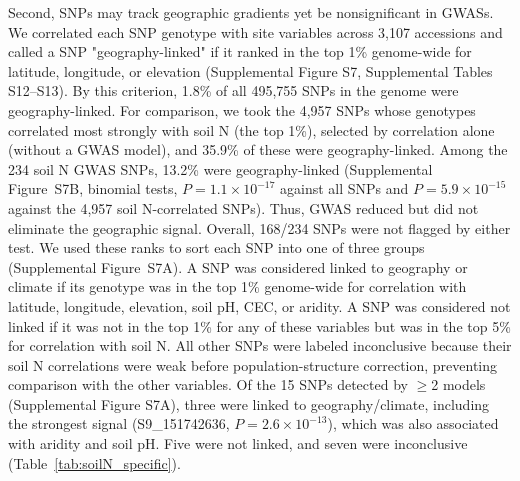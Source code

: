 \documentclass[namedate,unnumsec,webpdf,contemporary,large]{oup-authoring-template}
\begin{document}
Second, SNPs may track geographic gradients yet be nonsignificant in GWASs. We correlated each SNP genotype with site variables across 3,107 accessions and called a SNP "geography-linked" if it ranked in the top 1\% genome-wide for latitude, longitude, or elevation (Supplemental Figure S7, Supplemental Tables S12--S13). By this criterion, 1.8\% of all 495,755 SNPs in the genome were geography-linked. For comparison, we took the 4,957 SNPs whose genotypes correlated most strongly with soil N (the top 1\%), selected by correlation alone (without a GWAS model), and 35.9\% of these were geography-linked. Among the 234 soil N GWAS SNPs, 13.2\% were geography-linked (Supplemental Figure~S7B, binomial tests, $P = 1.1 \times 10^{-17}$ against all SNPs and $P = 5.9 \times 10^{-15}$ against the 4,957 soil N-correlated SNPs). Thus, GWAS reduced but did not eliminate the geographic signal. Overall, 168/234 SNPs were not flagged by either test. We used these ranks to sort each SNP into one of three groups (Supplemental Figure~S7A). A SNP was considered linked to geography or climate if its genotype was in the top 1\% genome-wide for correlation with latitude, longitude, elevation, soil pH, CEC, or aridity. A SNP was considered not linked if it was not in the top 1\% for any of these variables but was in the top 5\% for correlation with soil N. All other SNPs were labeled inconclusive because their soil N correlations were weak before population-structure correction, preventing comparison with the other variables. Of the 15 SNPs detected by $\geq$2 models (Supplemental Figure S7A), three were linked to geography/climate, including the strongest signal (S9\_151742636, $P = 2.6 \times 10^{-13}$), which was also associated with aridity and soil pH. Five were not linked, and seven were inconclusive (Table~\ref{tab:soilN_specific}).
\end{document}
